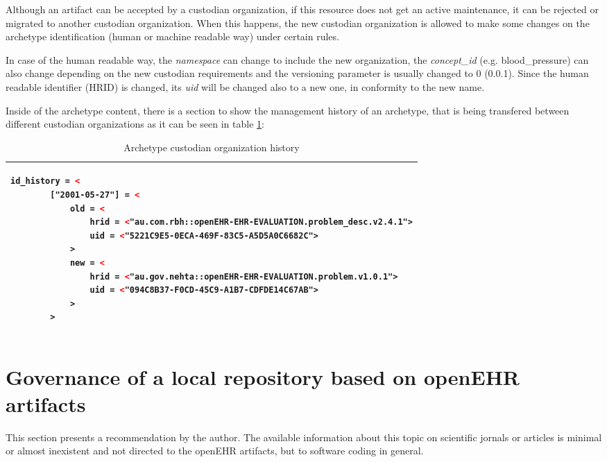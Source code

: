 \documentclass[mim_thesis.tex]{subfiles}
\begin{document}
Although an artifact can be accepted by a custodian organization, if this resource does not get an active maintenance, it can be rejected or migrated to another custodian organization. When this happens, the new custodian organization is allowed to make some changes on the archetype identification (human or machine readable way) under certain rules. 

In case of the human readable way, the \textit{namespace} can change to include the new organization, the \textit{concept\_id} (e.g. blood\_pressure) can also change depending on the new custodian requirements and the versioning parameter is usually changed to 0 (0.0.1). Since the human readable identifier (HRID) is changed, its \textit{uid} will be changed also to a new one, in conformity to the new name. 

Inside of the archetype content, there is a section to show the management history of an archetype, that is being transfered between different custodian organizations as it can be seen in table \ref{tab:arch_co_h}:

\begin{table}[H]
\caption{Archetype custodian organization history \citep{openehrckmgover2018}}
\label{tab:arch_co_h}
\centering
\begin{tabular}{l}
\toprule[2pt]
\begin{lstlisting}[language=XML]
    id_history = <
        ["2001-05-27"] = <
            old = <
                hrid = <"au.com.rbh::openEHR-EHR-EVALUATION.problem_desc.v2.4.1">
                uid = <"5221C9E5-0ECA-469F-83C5-A5D5A0C6682C">
            >
            new = <
                hrid = <"au.gov.nehta::openEHR-EHR-EVALUATION.problem.v1.0.1">
                uid = <"094C8B37-F0CD-45C9-A1B7-CDFDE14C67AB">
            >
        >
\end{lstlisting}
\tabularnewline \bottomrule[2pt]
\end{tabular}
\end{table}


\newpage
\section{Governance of a local repository based on openEHR artifacts}

This section presents a recommendation by the author. The available information about this topic on scientific jornals or articles is minimal or almost inexistent and not directed to the openEHR artifacts, but to software coding in general. \\
\end{document}
